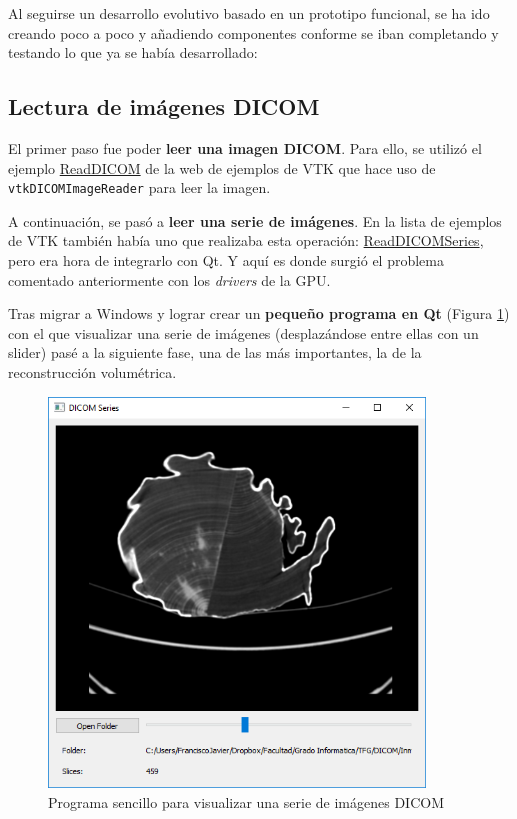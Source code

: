 Al seguirse un desarrollo evolutivo basado en un prototipo funcional, se ha ido creando poco a poco y añadiendo componentes conforme se iban completando y testando lo que ya se había desarrollado:

\subsection{Lectura de imágenes DICOM}

El primer paso fue poder \textbf{leer una imagen DICOM}. Para ello, se utilizó el ejemplo \href{http://www.vtk.org/Wiki/VTK/Examples/Cxx/IO/ReadDICOM}{ReadDICOM} de la web de ejemplos de VTK que hace uso de \texttt{vtkDICOMImageReader} para leer la imagen.

A continuación, se pasó a \textbf{leer una serie de imágenes}. En la lista de ejemplos de VTK también había uno que realizaba esta operación: \href{http://www.vtk.org/Wiki/VTK/Examples/Cxx/IO/ReadDICOMSeries}{ReadDICOMSeries}, pero era hora de integrarlo con Qt. Y aquí es donde surgió el problema comentado anteriormente con los \textit{drivers} de la GPU.

Tras migrar a Windows y lograr crear un \textbf{pequeño programa en Qt} (Figura \ref{fig:read_dicom_series_qt}) con el que visualizar una serie de imágenes (desplazándose entre ellas con un slider) pasé a la siguiente fase, una de las más importantes, la de la reconstrucción volumétrica.

\begin{figure}[H]
	\centering
	\includegraphics[width=10cm]{imagenes/read_dicom_series_qt}
	\caption{Programa sencillo para visualizar una serie de imágenes DICOM}
	\label{fig:read_dicom_series_qt}
\end{figure}

